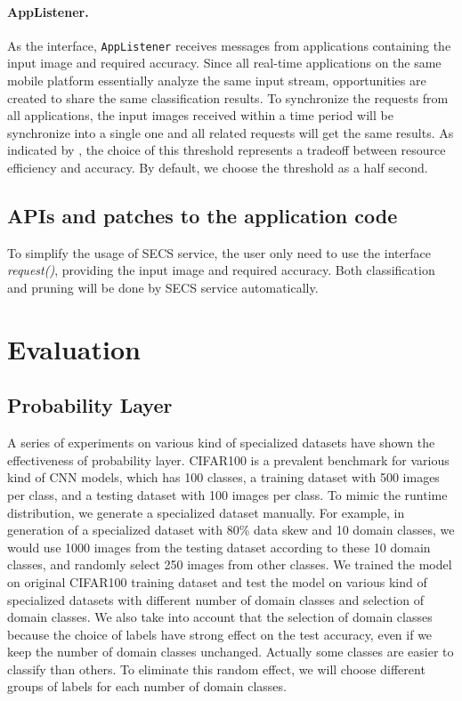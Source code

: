\documentclass[pageno]{jpaper}
\begin{document}
\paragraph{AppListener.}
As the interface, \texttt{AppListener} receives messages from applications containing the input image and required accuracy. Since all real-time applications on the same mobile platform essentially analyze the same input stream, opportunities are created to share the same classification results. To synchronize the requests from all applications, the input images received within a time period will be synchronize into a single one and all related requests will get the same results. As indicated by \cite{jiang2018mainstream}, the choice of this threshold represents a tradeoff between resource efficiency and accuracy. By default, we choose the threshold as a half second.

\subsection{APIs and patches to the application code}
To simplify the usage of SECS service, the user only need to use the interface \textit{request()}, providing the input image and required accuracy. Both classification and pruning will be done by SECS service automatically.








\section{Evaluation}








\subsection{Probability Layer}
A series of experiments on various kind of specialized datasets have shown the effectiveness of probability layer. CIFAR100 is a prevalent benchmark for various kind of CNN models, which has 100 classes, a training dataset with 500 images per class, and a testing dataset with 100 images per class. To mimic the runtime distribution, we generate a specialized dataset manually. For example, in generation of a specialized dataset with 80\% data skew and 10 domain classes, we would use 1000 images from the testing dataset according to these 10 domain classes, and randomly select 250 images from other classes. We trained the model on original CIFAR100 training dataset and test the model on various kind of specialized datasets with different number of domain classes and selection of domain classes. We also take into account that the selection of domain classes because the choice of labels have strong effect on the test accuracy, even if we keep the number of domain classes unchanged. Actually some classes are easier to classify than others. To eliminate this random effect, we will choose different groups of labels for each number of domain classes.
\end{document}
